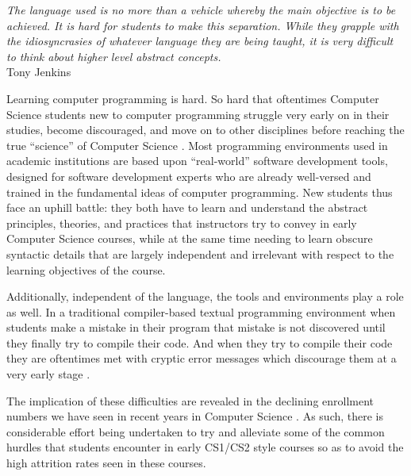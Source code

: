 \label{chapter:introduction}

\begin{flushright}
\textit{The language used is no more than a vehicle whereby the main objective is to be achieved. It is hard for students to make this separation. While they grapple with the idiosyncrasies of whatever language they are being taught, it is very difficult to think about higher level abstract concepts.}
\\
Tony Jenkins \cite{Jenkins02} \\
\end{flushright}

Learning computer programming is hard.  So hard that oftentimes Computer Science students new to computer programming struggle
very early on in their studies, become discouraged, and move on to other disciplines before reaching the true ``science'' of Computer Science \cite{Beaubouef05}.  Most programming environments used in academic institutions are based upon ``real-world'' software development tools, designed for software development experts who are already well-versed and trained in the fundamental ideas of computer programming.  New students thus face an uphill battle: they both have to learn and understand the abstract principles, theories, and practices that instructors try to convey in early Computer Science courses, while at the same time needing to learn obscure syntactic details that are largely independent and irrelevant with respect to the learning objectives of the course.

Additionally, independent of the language, the tools and environments play a role as well.  In a traditional compiler-based textual programming environment when students make a mistake in their program that mistake is not discovered until they finally try to compile their code.  And when they try to compile their code they are oftentimes met with cryptic error messages which discourage them at a very early stage \cite{Jenkins02,Hundhausen09,Kelleher05}.

The implication of these difficulties are revealed in the declining enrollment numbers we have seen in recent years in Computer Science \cite{Manaris07,Vesgo07,Ward08,Bayliss09}.  As such, there is considerable effort being undertaken to try and alleviate some of the common hurdles that students encounter in early CS1/CS2 style courses so as to avoid the high attrition rates seen in these courses.

